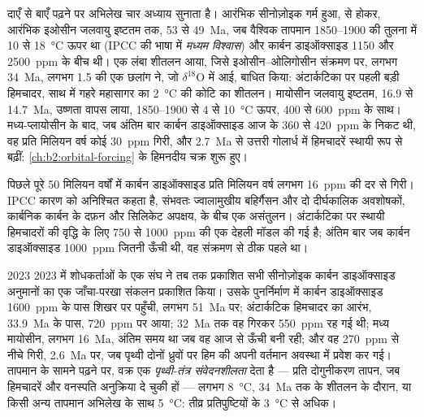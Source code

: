 दाएँ से बाएँ पढ़ने पर अभिलेख चार अध्याय सुनाता है। आरंभिक सीनोज़ोइक गर्म हुआ,  से होकर, आरंभिक इओसीन जलवायु इष्टतम तक, 53 से \qty{49}{Ma}, जब
वैश्विक तापमान 1850--1900 की तुलना में 10 से \qty{18}{\celsius} ऊपर था (IPCC की भाषा में \emph{मध्यम
विश्वास}) और कार्बन डाइऑक्साइड 1150 और \qty{2500}{ppm} के बीच थी।
एक लंबा शीतलन आया, जिसे इओसीन--ओलिगोसीन संक्रमण पर, लगभग \qty{34}{Ma}, लगभग \qty{1.5}{\permil} की
एक छलांग ने, जो $\delta^{18}$O में आई, बाधित किया: अंटार्कटिका पर पहली बड़ी हिमचादर, साथ में
गहरे महासागर का \qty{2}{\celsius} की कोटि का शीतलन। मायोसीन जलवायु इष्टतम, 16.9 से
\qty{14.7}{Ma}, उष्णता वापस लाया, 1850--1900 से 4 से \qty{10}{\celsius} ऊपर, 400 से
\qty{600}{ppm} के साथ। मध्य-प्लायोसीन के बाद, जब अंतिम बार कार्बन डाइऑक्साइड आज के 360 से
\qty{420}{ppm} के निकट थी, वह प्रति मिलियन वर्ष कोई \qty{30}{ppm} गिरी, और \qty{2.7}{Ma} से उत्तरी
गोलार्ध में हिमचादरें स्थायी रूप से बढ़ीं: \cref{ch:b2:orbital-forcing} के हिमनदीय चक्र शुरू हुए।

पिछले पूरे 50 मिलियन वर्षों में कार्बन डाइऑक्साइड प्रति मिलियन वर्ष लगभग \qty{16}{ppm} की दर से गिरी।
IPCC कारण को अनिश्चित कहता है, संभवतः ज्वालामुखीय बहिर्गैसन और दो दीर्घकालिक अवशोषकों, कार्बनिक
कार्बन के दफ़न और सिलिकेट अपक्षय, के बीच एक असंतुलन। अंटार्कटिका पर स्थायी हिमचादरों की वृद्धि के लिए 750 से
\qty{1000}{ppm} की एक देहली मॉडल की गई है; अंतिम बार जब कार्बन डाइऑक्साइड
\qty{1000}{ppm} जितनी ऊँची थी, वह संक्रमण से ठीक पहले था।

\begin{dated}{2023}
2023 में शोधकर्ताओं के एक संघ ने तब तक प्रकाशित सभी सीनोज़ोइक कार्बन डाइऑक्साइड अनुमानों का एक
जाँचा-परखा संकलन प्रकाशित किया। उसके पुनर्निर्माण में कार्बन डाइऑक्साइड \qty{1600}{ppm} के पास शिखर पर पहुँची, लगभग
\qty{51}{Ma} पर; अंटार्कटिक हिमचादर का आरंभ, \qty{33.9}{Ma} के पास, \qty{720}{ppm} पर आया;
\qty{32}{Ma} तक वह गिरकर \qty{550}{ppm} रह गई थी; मध्य मायोसीन, लगभग \qty{16}{Ma}, अंतिम
समय था जब वह आज से ऊँची बनी रही; और वह \qty{270}{ppm} से नीचे गिरी, \qty{2.6}{Ma} पर, जब पृथ्वी
दोनों ध्रुवों पर हिम की अपनी वर्तमान अवस्था में प्रवेश कर गई। तापमान के सामने पढ़ने पर, वक्र एक
\emph{पृथ्वी-तंत्र संवेदनशीलता} देता है --- प्रति दोगुनीकरण तापन, जब हिमचादरें और वनस्पति अनुक्रिया दे
चुकी हों --- लगभग \qty{8}{\celsius}, \qty{34}{Ma} तक के शीतलन के दौरान, या किसी अन्य तापमान अभिलेख के
साथ \qty{5}{\celsius}: तीव्र प्रतिपुष्टियों के \qty{3}{\celsius} से अधिक।
\end{dated}

